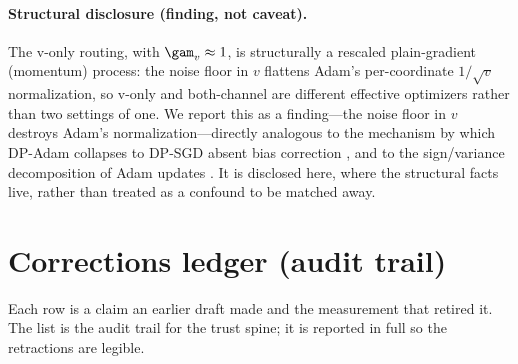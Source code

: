 \paragraph{Structural disclosure (finding, not caveat).}
The v-only routing, with $\gam_v\approx1$, is structurally a rescaled
plain-gradient (momentum) process: the noise floor in $v$ flattens Adam's
per-coordinate $1/\sqrt{v}$ normalization, so v-only and both-channel are
different effective optimizers rather than two settings of one. We report this as
a finding---the noise floor in $v$ destroys Adam's normalization---directly
analogous to the mechanism by which DP-Adam collapses to DP-SGD absent bias
correction \citep{dpadambc,litramer}, and to the sign/variance decomposition of
Adam updates \citep{balleshennig,kunstner}. It is disclosed here, where the
structural facts live, rather than treated as a confound to be matched away.

\section{Corrections ledger (audit trail)}
\label{app:corr}
Each row is a claim an earlier draft made and the measurement that retired it.
The list is the audit trail for the trust spine; it is reported in full so the
retractions are legible.

